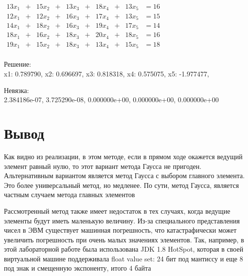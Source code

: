 \documentclass[12pt,letterpaper]{article}
\begin{document}
\begin{enumerate}
$\begin{array}{|lccccccccc}
13x_{1} &+& 15x_{2} &+& 13x_3 &+& 18x_4 &+& 13x_5 & = 16\\
12x_{1} &+& 12x_{2} &+& 16x_3 &+& 17x_4 &+& 13x_5 & = 15\\ 
14x_{1} &+& 18x_{2} &+& 16x_3 &+& 19x_4 &+& 17x_5 & = 14\\
18x_{1} &+& 16x_{2} &+& 18x_3 &+& 20x_4 &+& 18x_5 & = 16\\
19x_{1} &+& 15x_{2} &+& 18x_3 &+& 13x_4 &+& 15x_5 & = 18\\
\end{array}$

Решение: \\
x1: 0.789790, x2: 0.696697, x3: 0.818318, x4: 0.575075, x5: -1.977477, 

Невязка: \\
2.384186e-07, 3.725290e-08, 0.000000e+00, 0.000000e+00, 0.000000e+00
\end{enumerate}

\section*{Вывод}

Как видно из реализации, в этом методе, если в прямом ходе окажется ведущий элемент равный нулю, то этот вариант метода Гаусса не пригоден. Альтернативным вариантом является метод Гаусса с выбором главного элемента. Это более универсальный метод, но медленее. По сути, метод Гаусса, является частным случаем метода главных элементов

Рассмотренный метод также имеет недостаток в тех случаях, когда ведущие элементы будут иметь маленькую величину. Из-за специального представления чисел в ЭВМ существует машинная погрешность, что катастрафически может увеличить погрешность при очень малых значениях элементов. Так, например, в этой лабораторной работе была использована JDK 1.8 HotSpot, которая в своей виртуальной машине поддерживала float value set: 24 бит под мантиссу и еще 8 под знак и смещенную экспоненту, итого 4 байта
\end{document}
